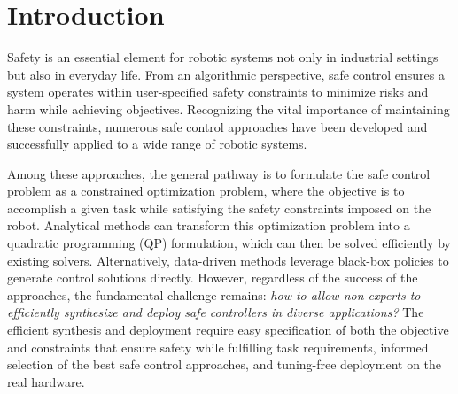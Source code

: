 \section{Introduction}
\label{sec: introduction}

Safety is an essential element for robotic systems not only in industrial settings but also in everyday life.
From an algorithmic perspective, safe control ensures a system operates within user-specified safety constraints to minimize risks and harm while achieving objectives. 
Recognizing the vital importance of maintaining these constraints, numerous safe control approaches have been developed and successfully applied to a wide range of robotic systems.

Among these approaches, the general pathway is to formulate the safe control problem as a constrained optimization problem, where the objective is to accomplish a given task while satisfying the safety constraints imposed on the robot.
Analytical methods can transform this optimization problem into a quadratic programming (QP) formulation, which can then be solved efficiently by existing solvers. Alternatively, data-driven methods leverage black-box policies to generate control solutions directly.
However, regardless of the success of the approaches, the fundamental challenge remains: \textit{how to allow non-experts to efficiently synthesize and deploy safe controllers in diverse applications?} The efficient synthesis and deployment require easy specification of both the objective and constraints that ensure safety while fulfilling task requirements, informed selection of the best safe control approaches, and tuning-free deployment on the real hardware. 


